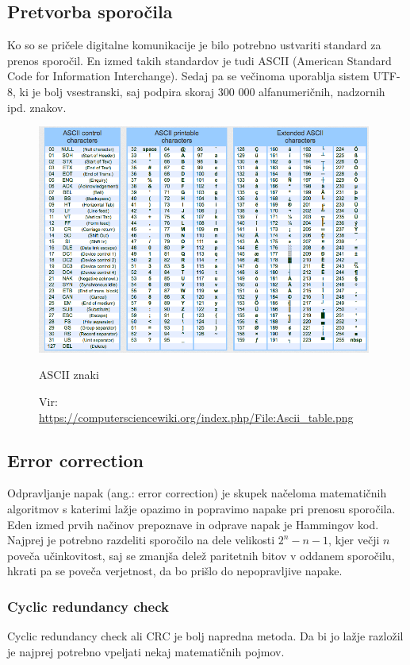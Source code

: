 \documentclass[12pt]{article}
\begin{document}
    \subsection{Pretvorba sporočila} 
        Ko so se pričele digitalne komunikacije je bilo potrebno ustvariti
        standard za prenos sporočil. En izmed takih standardov je tudi ASCII
        (American Standard Code for Information Interchange). Sedaj pa se
        večinoma uporablja sistem UTF-8, ki je bolj vsestranski, saj podpira
        skoraj 300 000 alfanumeričnih, nadzornih ipd. znakov.
        \begin{figure}[h!]
            \begin{center}
                \includegraphics[width=11cm, keepaspectratio]{slike/Ascii_table-572996368.png}
                \caption{ASCII znaki}
                \caption*{\footnotesize Vir: \url{https://computersciencewiki.org/index.php/File:Ascii_table.png}}
                \label{fig:tabelaZnakov}
            \end{center}
        \end{figure}
    \subsection{Error correction}
        Odpravljanje napak (ang.: error correction) je skupek načeloma 
        matematičnih algoritmov s katerimi lažje opazimo in popravimo napake pri
        prenosu sporočila.
        Eden izmed prvih načinov prepoznave in odprave napak je Hammingov kod. 
        Najprej je potrebno razdeliti sporočilo na dele velikosti $2^n - n - 1$,
        kjer večji $n$ poveča učinkovitost, saj se zmanjša delež paritetnih
        bitov v oddanem sporočilu, hkrati pa se poveča verjetnost, da bo prišlo
        do nepopravljive napake.
        \subsubsection{Cyclic redundancy check}
            Cyclic redundancy check ali CRC je bolj napredna metoda. Da bi jo 
            lažje razložil je najprej potrebno vpeljati nekaj matematičnih 
            pojmov.
\end{document}
